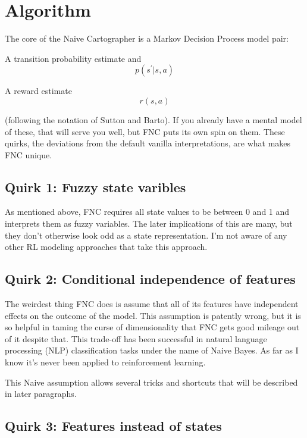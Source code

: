 \section{Algorithm}


The core of the Naive Cartographer is a Markov Decision Process model pair:

A transition probability estimate and
\begin{equation}
p(s^\prime | s, a)
\end{equation}

A reward estimate
\begin{equation}
r(s, a)
\end{equation}

(following the notation of Sutton and Barto). If you already have a mental model
of these, that will serve you well, but FNC puts its own spin on them.
These quirks, the deviations from the default vanilla interpretations,
are what makes FNC unique.

\subsection*{Quirk 1: Fuzzy state varibles}
\label{algofuzzy}

As mentioned above, FNC requires
all state values to be between 0 and 1 and interprets them as fuzzy variables.
The later implications of this are many, but they don't otherwise
look odd as a state representation. I'm not aware of any other RL modeling
approaches that take this approach.

\subsection*{Quirk 2: Conditional independence of features}
\label{algobayes}

The weirdest thing FNC does is assume that all of its features have
independent effects on the outcome of the model. This assumption
is patently wrong, but it is so helpful in taming the curse of
dimensionality that FNC gets good mileage out of it despite that.
This trade-off has been successful in natural language processing (NLP)
classification tasks under the name of Naive Bayes. As far as I know it's
never been applied to reinforcement learning.

This Naive assumption allows several tricks and shortcuts that will be
described in later paragraphs.

\subsection*{Quirk 3: Features instead of states}
\label{introstate}

